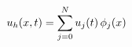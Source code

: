 \documentclass[preview]{standalone}
\begin{document}
\begin{align*}
\special{dvisvgm:raw <g id='unique000'>}u_h(x,t) = \sum_{j=0}^N u_j(t)\, \phi_j(x)\special{dvisvgm:raw </g>}
\end{align*}
\end{document}
